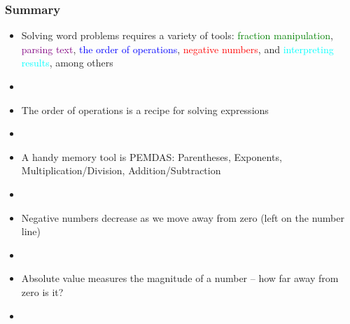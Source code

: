 \documentclass[11pt,dvipsnames]{beamer}
\newcommand{\myframe}[1]{\begin{frame} \frametitle{#1}}
\begin{document}
\myframe{Summary}
\begin{itemize}
\item Solving word problems requires a variety of tools: \textcolor{green}{fraction manipulation}, \textcolor{purple}{parsing text}, \textcolor{blue}{the order of operations}, \textcolor{red}{negative numbers}, and \textcolor{cyan}{interpreting results}, among others
\item[] \pause
\item The order of operations is a recipe for solving expressions
\item[] \pause
\item A handy memory tool is PEMDAS: Parentheses, Exponents, Multiplication/Division, Addition/Subtraction
\item[] \pause
\item Negative numbers decrease as we move away from zero (left on the number line)
\item[] \pause
\item Absolute value measures the magnitude of a number -- how far away from zero is it?
\item[]
\end{itemize}
\end{frame}
\end{document}
